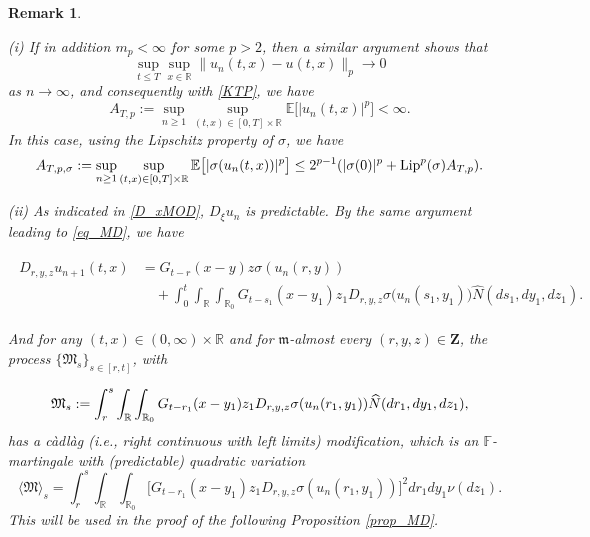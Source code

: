 \documentclass[letterpaper, 11pt,  reqno]{amsart}
\newcommand{\wh}{\widehat}
\newtheorem{remark}[theorem]{Remark}
\newcommand{\noi}{\noindent}
\newcommand{\R}{\mathbb{R}}
\newcommand{\E}{\mathbb{E}}
\newcommand{\s}{\sigma}
\newcommand{\jb}[1]
{\langle #1 \rangle}
\newcommand{\Lip}{\textup{Lip}}
\newcommand{\fm}{\mathfrak{m}}
\numberwithin{equation}{section}
\numberwithin{theorem}{section}
\begin{document}
\begin{remark}\rm \label{rem_MD}

(i)
If in addition $m_p<\infty$ for some $p>2$, then a similar argument shows that
\[
\sup_{t\leq T} \sup_{x\in\R}  \big\| u_n(t,x)-u(t,x) \big\|_p \to 0  
\]
as $n\to\infty$, and consequently with \eqref{KTP}, we have
\[
A_{T,p}:=\sup_{n\geq 1}\sup_{(t,x) \in [0,T]\times \R}\E\big[|u_n(t,x)|^p\big]<\infty.
\]
In this case, using the Lipschitz property of $\s$, we have
\begin{equation}
\label{ATPs}
A_{T,p,\s}:=\sup_{n\geq 1}\sup_{(t,x) \in [0,T]\times \R}\E\big[|\s(u_n(t,x))|^p\big] \leq 2^{p-1}(|\s(0)|^p+\Lip^p(\s)A_{T,p}).
\end{equation}

\smallskip
\noi
(ii) As indicated in \eqref{D_xMOD},
 $D_\xi u_n$ is predictable.   By the same argument leading to \eqref{eq_MD},
 we have 


\noi
\begin{align} 
\begin{aligned} \label{eq_MDN}
D_{r, y, z} u_{n+1}(t,x) 
&= G_{t-r}(x-y)z  \s( u_n(r, y)) \\
&\quad + \int_0^t \int_{\R} \int_{\R_0} G_{t-s_1}(x-y_1)  z_1 D_{r, y, z} \s\big( u_n(s_1, y_1) \big)   
\wh{N}(ds_1, dy_1, dz_1).
\end{aligned}
\end{align}

\noi
And for any $(t,x)\in(0,\infty)\times\R$
and  for $\fm$-almost every 
$(r,y,z)\in\mathbf{Z}$, the process $ \{\mathfrak{M}_s\}_{s\in[r,t]}$, with

\noi
 \begin{align}   \notag%
 \mathfrak{M}_s := \int_r^s\int_{\R}\int_{\R_0} G_{t-r_1}(x-y_1)z_1  D_{r, y, z}\s( u_n(r_1,y_1) )  
  \wh{N}(dr_1, dy_1, dz_1),
 \end{align}
 has a c\`adl\`ag {\rm(}i.e., right continuous with left limits{\rm)} modification,
 which is an $\mathbb{F}$-martingale with {\rm(}predictable{\rm )} quadratic variation
 \[
 \jb{\mathfrak{M}}_s
 =  \int_r^s\int_{\R}\int_{\R_0} \big[G_{t-r_1}(x-y_1)z_1  D_{r, y, z}\s( u_n(r_1,y_1) )  \big]^2   
 dr _1dy_1\nu(dz_1).
 \]
This will be used in the proof of the following Proposition \ref{prop_MD}.


 
 
 
\end{remark}
\end{document}

